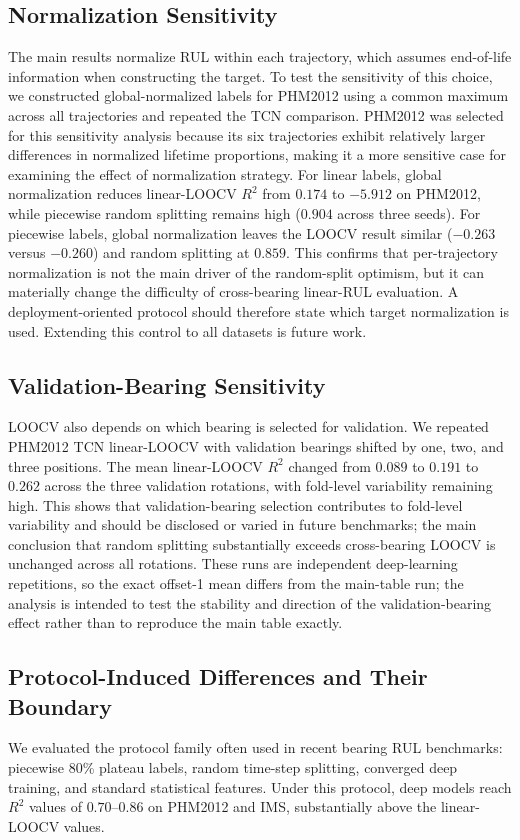 \documentclass[pdflatex,sn-mathphys-num]{sn-jnl}
\begin{document}
\subsection{Normalization Sensitivity}
The main results normalize RUL within each trajectory, which assumes end-of-life information when constructing the target. To test the sensitivity of this choice, we constructed global-normalized labels for PHM2012 using a common maximum across all trajectories and repeated the TCN comparison. PHM2012 was selected for this sensitivity analysis because its six trajectories exhibit relatively larger differences in normalized lifetime proportions, making it a more sensitive case for examining the effect of normalization strategy. For linear labels, global normalization reduces linear-LOOCV $R^2$ from $0.174$ to $-5.912$ on PHM2012, while piecewise random splitting remains high ($0.904$ across three seeds). For piecewise labels, global normalization leaves the LOOCV result similar ($-0.263$ versus $-0.260$) and random splitting at $0.859$. This confirms that per-trajectory normalization is not the main driver of the random-split optimism, but it can materially change the difficulty of cross-bearing linear-RUL evaluation. A deployment-oriented protocol should therefore state which target normalization is used. Extending this control to all datasets is future work.

\subsection{Validation-Bearing Sensitivity}
LOOCV also depends on which bearing is selected for validation. We repeated PHM2012 TCN linear-LOOCV with validation bearings shifted by one, two, and three positions. The mean linear-LOOCV $R^2$ changed from $0.089$ to $0.191$ to $0.262$ across the three validation rotations, with fold-level variability remaining high. This shows that validation-bearing selection contributes to fold-level variability and should be disclosed or varied in future benchmarks; the main conclusion that random splitting substantially exceeds cross-bearing LOOCV is unchanged across all rotations. These runs are independent deep-learning repetitions, so the exact offset-1 mean differs from the main-table run; the analysis is intended to test the stability and direction of the validation-bearing effect rather than to reproduce the main table exactly.

\subsection{Protocol-Induced Differences and Their Boundary}
We evaluated the protocol family often used in recent bearing RUL benchmarks: piecewise 80\% plateau labels, random time-step splitting, converged deep training, and standard statistical features. Under this protocol, deep models reach $R^2$ values of $0.70$--$0.86$ on PHM2012 and IMS, substantially above the linear-LOOCV values.
\end{document}
